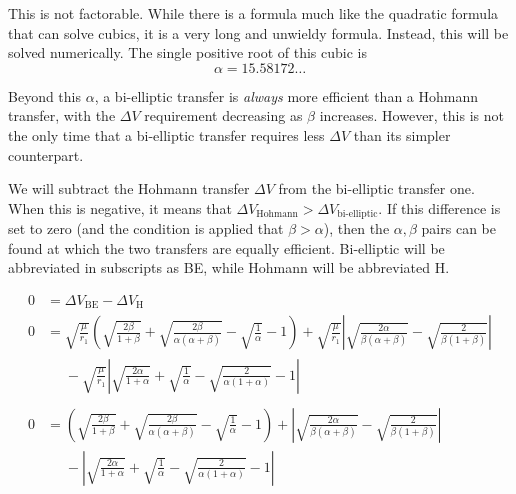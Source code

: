 \documentclass{article}
\begin{document}
This is not factorable. While there is a formula much like the quadratic formula that can solve cubics, it is a very long and unwieldy formula. Instead, this will be solved numerically. The single positive root of this cubic is
$$\alpha=15.58172\dots$$

Beyond this $\alpha$, a bi-elliptic transfer is \textit{always} more efficient than a Hohmann transfer, with the $\Delta V$ requirement decreasing as $\beta$ increases. However, this is not the only time that a bi-elliptic transfer requires less $\Delta V$ than its simpler counterpart.

We will subtract the Hohmann transfer $\Delta V$ from the bi-elliptic transfer one. When this is negative, it means that $\Delta V_\text{Hohmann}>\Delta V_\text{bi-elliptic}$. If this difference is set to zero (and the condition is applied that $\beta>\alpha$), then the $\alpha,\beta$ pairs can be found at which the two transfers are equally efficient. Bi-elliptic will be abbreviated in subscripts as BE, while Hohmann will be abbreviated H.

\begin{align*}
    0 & =\Delta V_\text{BE}-\Delta V _\text{H}                                                                                                                                                                                                               \\
    0 & =\sqrt{\frac{\mu}{r_1}}\left(\sqrt{\frac{2\beta}{1+\beta}}+\sqrt{\frac{2\beta}{\alpha(\alpha+\beta)}}-\sqrt{\frac{1}{\alpha}}-1\right)+\sqrt{\frac{\mu}{r_1}}\left|\sqrt{\frac{2\alpha}{\beta(\alpha+\beta)}}-\sqrt{\frac{2}{\beta(1+\beta)}}\right| \\
      & \phantom{=}-\sqrt{\frac{\mu}{r_1}}\left|\sqrt{\frac{2\alpha}{1+\alpha}}+\sqrt{\frac{1}{\alpha}}-\sqrt{\frac{2}{\alpha(1+\alpha)}}-1\right|                                                                                                           \\\\
    0 & =\left(\sqrt{\frac{2\beta}{1+\beta}}+\sqrt{\frac{2\beta}{\alpha(\alpha+\beta)}}-\sqrt{\frac{1}{\alpha}}-1\right)+\left|\sqrt{\frac{2\alpha}{\beta(\alpha+\beta)}}-\sqrt{\frac{2}{\beta(1+\beta)}}\right|                                             \\
      & \phantom{=}-\left|\sqrt{\frac{2\alpha}{1+\alpha}}+\sqrt{\frac{1}{\alpha}}-\sqrt{\frac{2}{\alpha(1+\alpha)}}-1\right|                                                                                                                                 \\
\end{align*}
\end{document}
